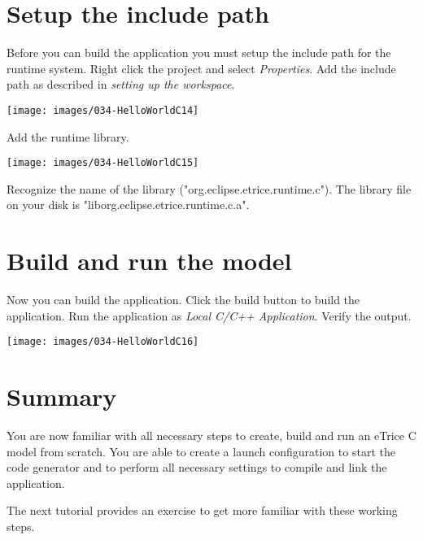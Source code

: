 \section{Setup the include path}

Before you can build the application you must setup the include path for the runtime system. Right click the project and select \textit{Properties}. Add the include path as described in \textit{setting up the workspace}.

\texttt{[image: images/034-HelloWorldC14]}

Add the runtime library.

\texttt{[image: images/034-HelloWorldC15]}

Recognize the name of the library ("org.eclipse.etrice.runtime.c"). The library file on your disk is "liborg.eclipse.etrice.runtime.c.a". 

\section{Build and run the model}

Now you can build the application. Click the build button to build the application.
Run the application as \textit{Local C/C++ Application}.
Verify the output.

\texttt{[image: images/034-HelloWorldC16]}

\section{Summary}

You are now familiar with all necessary steps to create, build and run an eTrice C model from scratch. You are able to create a launch configuration to start the code generator and to perform all necessary settings to compile and link the application.  

The next tutorial provides an exercise to get more familiar with these working steps.
